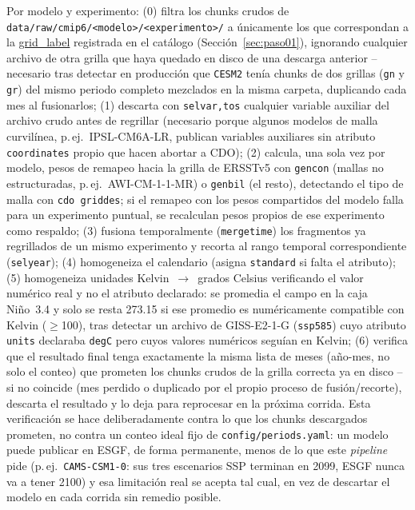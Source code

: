 \documentclass[11pt,a4paper]{article}
\newcommand{\archivo}[1]{\begingroup\hypersetup{urlcolor=black}\url{#1}\endgroup}
\begin{document}
Por modelo y experimento: (0) filtra los chunks crudos de \texttt{data/raw/cmip6/<modelo>/<experimento>/} a \'unicamente los que correspondan a la \archivo{grid_label} registrada en el cat\'alogo (Secci\'on~\ref{sec:paso01}), ignorando cualquier archivo de otra grilla que haya quedado en disco de una descarga anterior -- necesario tras detectar en producci\'on que \texttt{CESM2} ten\'ia chunks de dos grillas (\texttt{gn} y \texttt{gr}) del mismo periodo completo mezclados en la misma carpeta, duplicando cada mes al fusionarlos; (1) descarta con \texttt{selvar,tos} cualquier variable auxiliar del archivo crudo antes de regrillar (necesario porque algunos modelos de malla curvil\'inea, p.\,ej.\ IPSL-CM6A-LR, publican variables auxiliares sin atributo \texttt{coordinates} propio que hacen abortar a CDO); (2) calcula, una sola vez por modelo, pesos de remapeo hacia la grilla de ERSSTv5 con \texttt{gencon} (mallas no estructuradas, p.\,ej.\ AWI-CM-1-1-MR) o \texttt{genbil} (el resto), detectando el tipo de malla con \texttt{cdo griddes}; si el remapeo con los pesos compartidos del modelo falla para un experimento puntual, se recalculan pesos propios de ese experimento como respaldo; (3) fusiona temporalmente (\texttt{mergetime}) los fragmentos ya regrillados de un mismo experimento y recorta al rango temporal correspondiente (\texttt{selyear}); (4) homogeneiza el calendario (asigna \texttt{standard} si falta el atributo); (5) homogeneiza unidades Kelvin~$\to$~grados Celsius verificando el valor num\'erico real y no el atributo declarado: se promedia el campo en la caja Ni\~no~3.4 y solo se resta 273.15 si ese promedio es num\'ericamente compatible con Kelvin ($\geq$100), tras detectar un archivo de GISS-E2-1-G (\texttt{ssp585}) cuyo atributo \texttt{units} declaraba \texttt{degC} pero cuyos valores num\'ericos segu\'ian en Kelvin; (6) verifica que el resultado final tenga exactamente la misma lista de meses (a\~no-mes, no solo el conteo) que prometen los chunks crudos de la grilla correcta ya en disco -- si no coincide (mes perdido o duplicado por el propio proceso de fusi\'on/recorte), descarta el resultado y lo deja para reprocesar en la pr\'oxima corrida. Esta verificaci\'on se hace deliberadamente contra lo que los chunks descargados prometen, no contra un conteo ideal fijo de \texttt{config/periods.yaml}: un modelo puede publicar en ESGF, de forma permanente, menos de lo que este \emph{pipeline} pide (p.\,ej.\ \texttt{CAMS-CSM1-0}: sus tres escenarios SSP terminan en 2099, ESGF nunca va a tener 2100) y esa limitaci\'on real se acepta tal cual, en vez de descartar el modelo en cada corrida sin remedio posible.
\end{document}
